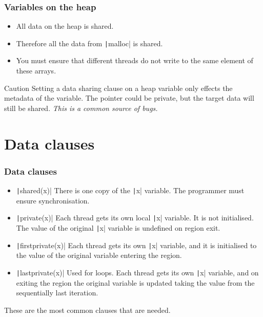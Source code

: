 \documentclass[aspectratio=169]{beamer}
\begin{document}
\begin{frame}
\frametitle{Variables on the heap}
\begin{itemize}
  \item All data on the heap is shared.
  \item Therefore all the data from \texttt|malloc| is shared.
  \item You must ensure that different threads do not write to the same element of these arrays.
\end{itemize}

\begin{alertblock}{Caution}
Setting a data sharing clause on a heap variable only effects the metadata of the variable.
The pointer could be private, but the target data will still be shared.
\textit{This is a common source of bugs.}
\end{alertblock}
\end{frame}

\section{Data clauses}
\begin{frame}
\frametitle{Data clauses}
\begin{itemize}
  \item \texttt|shared(x)|
    There is one copy of the \texttt|x| variable. The programmer must ensure synchronisation.
  \item \texttt|private(x)|
    Each thread gets its own local \texttt|x| variable. It is not initialised. The value of the original \texttt|x| variable is undefined on region exit.
  \item \texttt|firstprivate(x)|
    Each thread gets its own \texttt|x| variable, and it is initialised to the value of the original variable entering the region.
  \item \texttt|lastprivate(x)|
    Used for loops. Each thread gets its own \texttt|x| variable, and on exiting the region the original variable is updated taking the value from the sequentially last iteration.
\end{itemize}

These are the most common clauses that are needed.
\end{frame}
\end{document}
